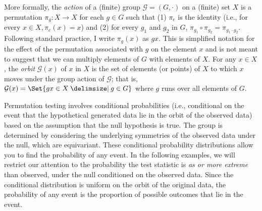 
More formally,
the \emph{action} of a (finite) group $\mathcal{G} = (G, \cdot)$ on a (finite) set $X$
is a permutation $\pi_g: X \to X$ for each $g \in G$ such that (1) $\pi_e$ is the identity
(i.e., for every $x \in X, \pi_e(x) = x$) and (2) for every $g_1$ and $g_2$ in $G$,
$\pi_{g_1} \circ \pi_{g_2} = \pi_{g_1 \cdot g_2}$.  Following standard practice, I write $\pi_g(x)$ as $gx$.
This is simplified notation for the effect of the permutation associated with $g$ on the
element $x$ and is not meant to suggest that we can multiply elements of $G$ with elements of $X$.
For any $x \in X$, the \emph{orbit} $\mathcal{G}(x)$ of $x$ in $X$ is
the set of elements (or points) of $X$ to which $x$ moves under the group
action of $\mathcal{G}$; that is,
$\mathcal{G}(x) = \Set{gx \in X \given g \in G}$
where $g$ runs over all elements of $G$.   

Permutation testing involves conditional probabilities (i.e., conditional on
the event that the hypothetical generated data lie in the orbit of the observed
data) based on the assumption that the null hypothesis is true.  The group is
determined by considering the underlying symmetries of the observed data under
the null, which are equivariant.  These  conditional probability distributions
allow you to find the probability of any event.  In the following examples, we
will restrict our attention to the probability the test statistic is \emph{as
or more extreme} than observed, under the null conditioned on the observed
data.  Since the conditional distribution is uniform on the orbit of the
original data, the probability of any event is the proportion of possible
outcomes that lie in the event.

